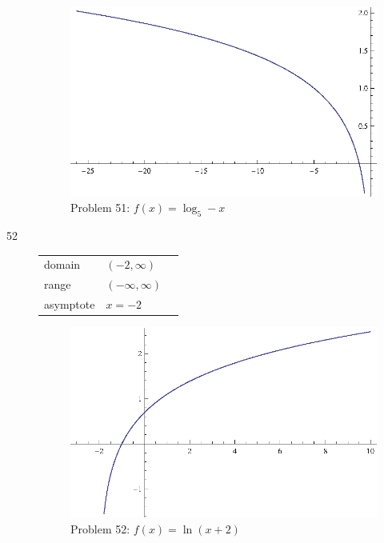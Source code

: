 \documentclass{exam}
\begin{document}
\begin{description}
      \begin{figure}[h]
        \centering
        \includegraphics[scale = 0.9]{problem51.eps}
        \caption{Problem 51: $f(x) = \log_{5} -x$}
      \end{figure}

    \item[52]
      \begin{tabular}[h]{lll}
        \toprule
        domain    & $(-2, \infty)$ \\
        range     & $(-\infty, \infty)$ \\
        asymptote & $x = -2$ \\
        \bottomrule
      \end{tabular}

      \begin{figure}[h]
        \centering
        \includegraphics[scale = 0.9]{problem52.eps}
        \caption{Problem 52: $f(x) = \ln(x + 2)$}
      \end{figure}


\end{description}
\end{document}
